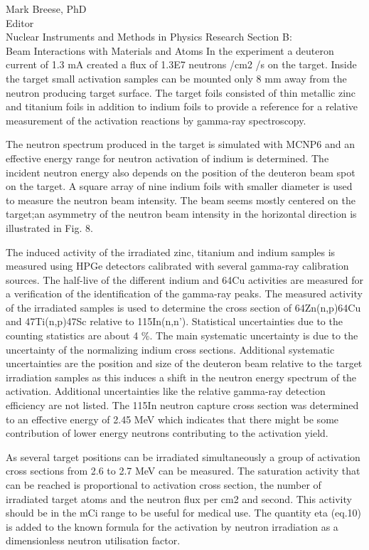 \documentclass{letter} %
\begin{document}
\begin{letter}{Mark Breese, PhD \\
Editor \\
Nuclear Instruments and Methods in Physics Research Section B: \\
Beam Interactions with Materials and Atoms}
In the experiment a deuteron current of 1.3 mA created a flux of 1.3E7 neutrons /cm2 /s on the target. Inside the target small activation samples can be mounted only 8 mm away from the neutron producing target surface. The target foils consisted of thin metallic zinc and titanium foils in
addition to indium foils to provide a reference for a relative measurement of the activation reactions by gamma-ray spectroscopy.

The neutron spectrum produced in the target is simulated with MCNP6 and an effective energy range for neutron activation of indium is determined.
The incident neutron energy also depends on the position of the deuteron beam spot on the target. A square array of nine indium foils  with smaller diameter is used to measure the neutron beam intensity. The beam seems mostly centered on the target;an asymmetry of the neutron beam intensity in the horizontal direction is illustrated in Fig. 8.

The induced activity of the irradiated zinc, titanium and indium samples is measured using HPGe detectors calibrated with several gamma-ray calibration sources. The half-live of the different indium and 64Cu activities are measured for a verification of the identification of the gamma-ray peaks.
The measured activity of the irradiated samples is used to determine the  cross section of 64Zn(n,p)64Cu and 47Ti(n,p)47Sc relative to 115In(n,n'). Statistical uncertainties due to the counting statistics are about 4 \%. The main systematic uncertainty is due to the uncertainty of the normalizing indium cross sections. Additional systematic uncertainties are the position
and size of the deuteron beam relative to the target irradiation samples as this induces a shift in the neutron energy spectrum of the activation. Additional uncertainties like the relative gamma-ray detection efficiency are not listed. The 115In neutron capture cross section was determined to
an effective energy of 2.45 MeV which indicates that there might be some contribution of lower energy neutrons contributing to the activation yield.

As several target positions can be irradiated simultaneously a group of activation cross sections from 2.6 to 2.7 MeV can be measured. The saturation activity that can be reached is proportional to activation cross section, the number of irradiated target atoms and the neutron flux per cm2 and second. This activity should be in the mCi range to be useful for
medical use. The quantity eta (eq.10) is added to the known formula for the activation by neutron irradiation as a dimensionless neutron utilisation factor.


\end{letter}
\end{document}
